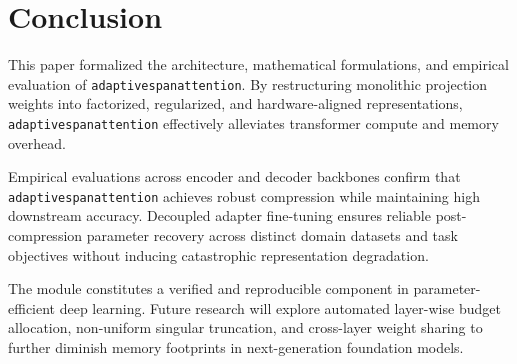 \section{Conclusion}
This paper formalized the architecture, mathematical formulations, and empirical evaluation of \texttt{adaptivespanattention}. By restructuring monolithic projection weights into factorized, regularized, and hardware-aligned representations, \texttt{adaptivespanattention} effectively alleviates transformer compute and memory overhead.

Empirical evaluations across encoder and decoder backbones confirm that \texttt{adaptivespanattention} achieves robust compression while maintaining high downstream accuracy. Decoupled adapter fine-tuning ensures reliable post-compression parameter recovery across distinct domain datasets and task objectives without inducing catastrophic representation degradation.

The module constitutes a verified and reproducible component in parameter-efficient deep learning. Future research will explore automated layer-wise budget allocation, non-uniform singular truncation, and cross-layer weight sharing to further diminish memory footprints in next-generation foundation models.
